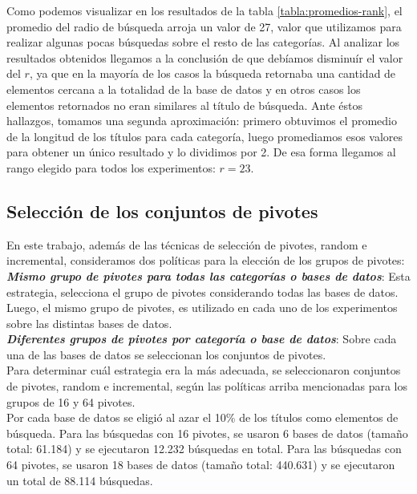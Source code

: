 Como podemos visualizar en los resultados de la tabla \ref{tabla:promedios-rank}, el promedio del radio de b\'usqueda arroja un valor de 27, valor que utilizamos para realizar algunas pocas b\'usquedas sobre el resto de las categor\'ias. Al analizar los resultados obtenidos llegamos a la conclusi\'on de que deb\'iamos disminu\'ir el valor del $r$, ya que en la mayor\'ia de los casos la b\'usqueda retornaba una cantidad de elementos cercana a la totalidad de la base de datos y en otros casos los elementos retornados no eran similares al t\'itulo de b\'usqueda. Ante \'estos hallazgos, tomamos una segunda aproximaci\'on: primero obtuvimos el promedio de la longitud de los t\'itulos para cada categor\'ia, luego promediamos esos valores para obtener un \'unico resultado y lo dividimos por 2.  De esa forma llegamos al rango elegido para todos los experimentos: $r=23$.


\subsection{Selecci\'on de los conjuntos de pivotes}

En este trabajo, adem\'as de las t\'ecnicas de selecci\'on de pivotes, random e incremental, consideramos dos pol\'iticas para la elecci\'on de los grupos de pivotes:\\

\textit{\textbf{Mismo grupo de pivotes para todas las categor\'ias o bases de datos}}: Esta estrategia, selecciona el grupo de pivotes considerando todas las bases de datos. Luego, el mismo grupo de pivotes, es utilizado en cada uno de los experimentos sobre las distintas bases de datos.\\

\textit{\textbf{Diferentes grupos de pivotes por categor\'ia o base de datos}}: Sobre cada una de las bases de datos se seleccionan los conjuntos de pivotes.\\

Para determinar cu\'al estrategia era la m\'as adecuada, se seleccionaron conjuntos de pivotes, random e incremental, seg\'un las pol\'iticas arriba mencionadas para los grupos de 16 y 64 pivotes.\\

Por cada base de datos se eligi\'o al azar el 10\% de los t\'itulos como elementos de b\'usqueda. Para las b\'usquedas con 16 pivotes, se usaron 6 bases de datos (tamaño total: 61.184) y se ejecutaron 12.232  b\'usquedas en total. Para las b\'usquedas con 64 pivotes, se usaron 18 bases de datos (tamaño total: 440.631) y se ejecutaron un total de 88.114 b\'usquedas.\\

